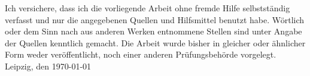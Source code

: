 \normalsize{Ich versichere, dass ich die vorliegende Arbeit ohne fremde Hilfe selbstständig verfasst und nur die angegebenen Quellen und Hilfsmittel benutzt habe. Wörtlich 
oder dem Sinn nach aus anderen
Werken entnommene Stellen sind unter Angabe der Quellen kenntlich gemacht. Die Arbeit wurde bisher in gleicher oder ähnlicher Form weder 
veröffentlicht, noch 
einer anderen Prüfungsbehörde vorgelegt.
\newline
\newline
\newline
\newline
Leipzig, den \today}